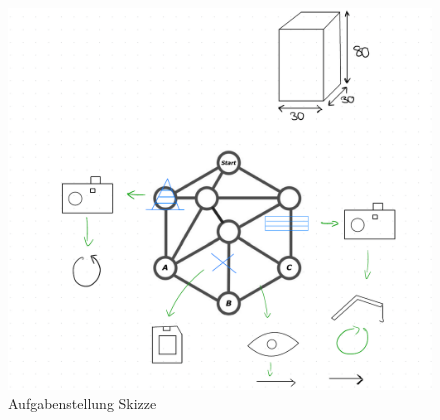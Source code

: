 \documentclass{article}
\begin{document}
\begin{figure}[H]
	\centering
	\includegraphics[width=0.6\linewidth]{Images/Pren_Skizze_Anforderungen.png}
	\caption{Aufgabenstellung Skizze}
	\label{fig:enter-label}
\end{figure}
\end{document}
